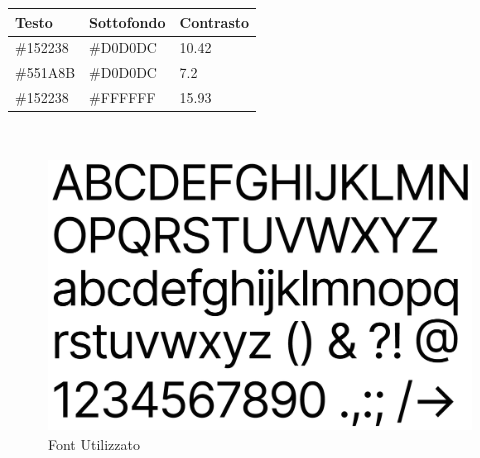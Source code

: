 \begin{tabular}{| C{4.5cm} | C{4.5cm} | C{4.5cm} |}
		\hline
		\textbf{Testo} & \textbf{Sottofondo} & \textbf{Contrasto}\\
		\hline
		\#152238 & \#D0D0DC & 10.42\\
		\#551A8B & \#D0D0DC & 7.2\\
		\#152238 & \#FFFFFF & 15.93\\
		\hline
	\end{tabular}\\

\begin{figure}[H]
	\centering
	\includegraphics[scale=0.4]{res/font.png}
	\caption{Font Utilizzato}
\end{figure}